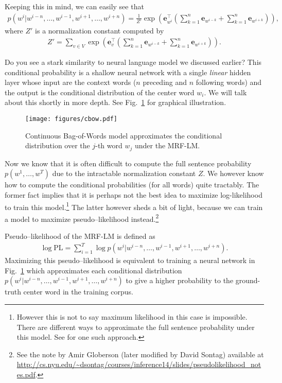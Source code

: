 \documentclass{report}
\newcommand{\vect}[1]{\mathbf{#1}}
\newcommand{\ve}[0]{\vect{e}}
\newcommand{\PL}{\text{PL}}
\begin{document}
Keeping this in mind, we can easily see that
\begin{align*}
    p(w^i|w^{i-n}, \ldots, w^{i-1}, w^{i+1}, \ldots, w^{i+n})
    = \frac{1}{Z'} \exp\left(\ve_{w^i}^\top \left( 
            \sum_{k=1}^n 
            \ve_{w^{i-k}}
            +
            \sum_{k=1}^n 
            \ve_{w^{i+k}}
    \right)\right),
\end{align*}
where $Z'$ is a normalization constant computed by
\begin{align*}
    Z' = \sum_{v \in V} \exp\left( \ve_v^\top \left( 
            \sum_{k=1}^n 
            \ve_{w^{i-k}}
            +
            \sum_{k=1}^n 
            \ve_{w^{i+k}}
    \right)\right).
\end{align*}

Do you see a stark similarity to neural language model we discussed earlier?
This conditional probability is a shallow neural network with a single {\em
linear} hidden layer whose input are the context words ($n$ preceding and $n$
following words) and the output is the conditional distribution of the center
word $w_i$. We will talk about this shortly in more depth. See
Fig.~\ref{fig:cbow} for graphical illustration.

\begin{figure}[ht]
    \centering
    \texttt{[image: figures/cbow.pdf]}
    \caption{Continuous Bag-of-Words model approximates the conditional
    distribution over the $j$-th word $w_j$ under the MRF-LM.}
    \label{fig:cbow}
\end{figure}

Now we know that it is often difficult to compute the full sentence probability
$p(w^1, \ldots, w^T)$ due to the intractable normalization constant $Z$. We
however know how to compute the conditional probabilities (for all words) quite
tractably. The former fact implies that it is perhaps not the best idea to
maximize log-likelihood to train this model.\footnote{
    However this is not to say maximum likelihood in this case is impossible.
    There are different ways to approximate the full sentence probability under
    this model. See \cite{jernite2015fast} for one such approach.
} The latter however sheds a bit of light, because we can train a model to
maximize pseudo--likelihood \cite{besag1975statistical} instead.\footnote{
    See the note by Amir Globerson (later modified by David Sontag) available at
    \url{http://cs.nyu.edu/~dsontag/courses/inference14/slides/pseudolikelihood_notes.pdf}.
}

Pseudo--likelihood of the MRF-LM is defined as
\begin{align}
    \label{eq:pl_cbow}
    \log \PL = \sum_{i=1}^T \log p(w^i | w^{i-n}, \ldots, w^{i-1}, w^{i+1}, \ldots,
    w^{i+n}).
\end{align}
Maximizing this pseudo--likelihood is equivalent to training a neural network in
Fig.~\ref{fig:cbow} which approximates each conditional distribution $p(w^i |
w^{i-n}, \ldots, w^{i-1}, w^{i+1}, \ldots, w^{i+n})$ to give a higher
probability to the ground-truth center word in the training corpus.
\end{document}
